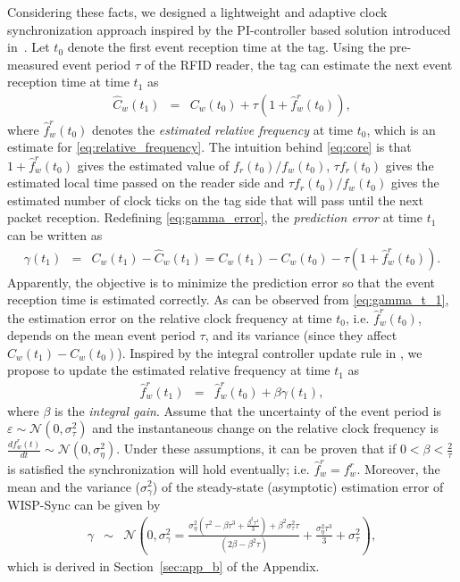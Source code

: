 \documentclass[journal,draftcls,onecolumn,12pt,twoside]{IEEEtranTCOM}
\begin{document}
Considering these facts, we designed a lightweight and adaptive clock synchronization approach inspired by the PI-controller based solution introduced in~\cite{pi2015}. Let $t_0$ denote the first event reception time at the tag. Using the pre-measured event period $\tau$ of the RFID reader, the tag can estimate the next event reception time at time $t_1$ as
\begin{eqnarray}
\hat{C}_w(t_1) &=& C_w(t_0)+\tau(1+\hat{f}_w^r(t_0)), \label{eq:core}
\end{eqnarray}
where $\hat{f}_w^r(t_0)$ denotes the \emph{estimated relative frequency} at time $t_0$, which is an estimate for \eqref{eq:relative_frequency}. The intuition behind \eqref{eq:core} is that $1+\hat{f}_w^r(t_0)$ gives the estimated value of $f_r(t_0)/f_w(t_0)$, $\tau f_r(t_0)$ gives the estimated local time passed on the reader side and $\tau f_r(t_0)/f_w(t_0)$ gives the estimated number of clock ticks on the tag side that will pass until the next packet reception. Redefining \eqref{eq:gamma_error}, the \emph{prediction error} at time $t_1$ can be written as
\begin{eqnarray}
\gamma(t_1) & = & 
C_{w}(t_{1})-\hat{C}_{w}(t_{1}) = 
C_{w}(t_{1})-C_{w}(t_{0})-\tau(1+\hat{f}_{w}^{r}(t_0)). \label{eq:gamma_t_1}
\end{eqnarray}
Apparently, the objective is to minimize the prediction error so that the event reception time is estimated correctly. As can be observed from \eqref{eq:gamma_t_1}, the estimation error on the relative clock frequency at time $t_0$, i.e. $\hat{f}_w^r(t_0)$, depends on the mean event period $\tau$, and its variance (since they affect $C_w(t_1)-C_w(t_0)$). Inspired by the integral controller update rule in \cite[Section III, (5)]{pi2015}, we propose to update the estimated relative frequency at time $t_1$ as
\begin{eqnarray}
\hat{f}_{w}^{r}(t_1) &=& \hat{f}_{w}^{r}(t_0)+\beta\gamma(t_1), 
\label{eq:update_rule}
\end{eqnarray}
where $\beta$ is the \emph{integral gain}. Assume that the uncertainty of the event period is $\varepsilon\sim\mathcal{N}(0,\sigma^2_{\tau})$ and the instantaneous change on the relative clock frequency is $\frac{df_{w}^{r}(t)}{dt}\sim\mathcal{N}(0,\sigma_{\eta}^{2})$. Under these assumptions, it can be proven that if $0<\beta<\frac{2}{\tau}$ is satisfied the synchronization will hold eventually; i.e. $\hat{f}_{w}^{r}=f_{w}^{r}$. Moreover, the mean and the variance ($\sigma^2_\gamma$) of the steady-state (asymptotic) estimation error of WISP-Sync can be given by 
\begin{eqnarray}
\gamma & \sim & \mathcal{N} \left(0,\sigma^2_\gamma=\frac{\sigma^2_{\eta}\left(\tau^2-\beta\tau^3+\frac{\beta^2\tau^4}{3}\right)+\beta^2\sigma^2_{\tau}\tau}{(2\beta-\beta^2\tau)}+\frac{\sigma^2_{\eta}\tau^3}{3}+  \sigma^2_{\tau} \right),
\label{eq:sync_performance}
\end{eqnarray}
which is derived in Section~\ref{sec:app_b} of the Appendix.
\end{document}
